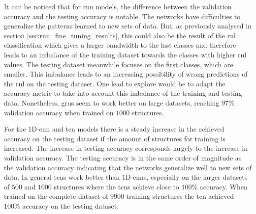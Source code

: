\documentclass[conference]{IEEEtran}
\begin{document}
It can be noticed that for \gls{rnn} models, the difference between the validation accuracy and the testing accuracy is notable. The networks have difficulties to generalize the patterns learned to new sets of data. But, as previously analysed in section \ref{sec:rnn_fine_tuning_results}, this could also be the result of the \gls{rul} classification which gives a larger bandwidth to the last classes and therefore leads to an imbalance of the training dataset towards the classes with higher \gls{rul} values. The testing dataset meanwhile focuses on the first classes, which are smaller. This imbalance leads to an increasing possibility of wrong predictions of the \gls{rul} on the testing dataset. One lead to explore would be to adapt the accuracy metric to take into account this imbalance of the training and testing data. Nonetheless, \glspl{gru} seem to work better on large datasets, reaching $ 97 \% $ validation accuracy when trained on  $ 1000 $ structures.

For the 1D-\gls{cnn} and \gls{tcn} models there is a steady increase in the achieved accuracy on the testing dataset if the amount of structures for training is increased. The increase in testing accuracy corresponds largely to the increase in validation accuracy. The testing accuracy is in the same order of magnitude as the validation accuracy indicating that the networks generalize well to new sets of data. In general \glspl{tcn} work better than 1D-\glspl{cnn}, especially on the larger datasets of $ 500 $ and $ 1000 $ structures where the \glspl{tcn} achieve close to $ 100 \% $ accuracy. When trained on the complete dataset of $ 9900 $ training structures the \gls{tcn} achieved $ 100 \% $ accuracy on the testing dataset.
\end{document}

